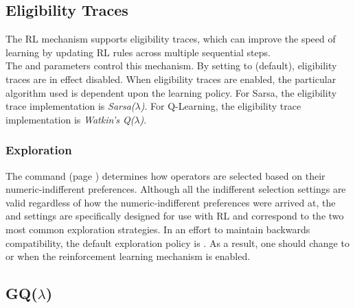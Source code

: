 \subsection{Eligibility Traces}
\label{RL-et}

The RL mechanism supports eligibility traces, which can improve the speed of learning by 
updating RL rules across multiple sequential steps. \\
The  and  parameters control this mechanism.
By setting  to  (default), eligibility traces are in effect disabled.
When eligibility traces are enabled, the particular algorithm used is dependent upon the learning policy.
For Sarsa, the eligibility trace implementation is \emph{Sarsa($\lambda$)}. 
For Q-Learning, the eligibility trace implementation is \emph{Watkin's Q($\lambda$)}.

\subsubsection{Exploration}

The  command (page \pageref{decide-indifferent-selection}) determines how operators are selected based on their numeric-indifferent preferences.
Although all the indifferent selection settings are valid regardless of how the numeric-indifferent preferences were arrived at, the  and  settings are specifically designed for use with RL and correspond to the two most common exploration strategies.
In an effort to maintain backwards compatibility, the default exploration policy is .
As a result, one should change to  or  when the reinforcement learning mechanism is enabled.

\subsection{\texorpdfstring{GQ($\lambda$)}{GQ(lambda)}}

